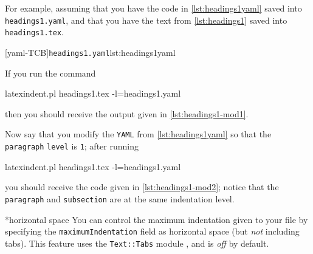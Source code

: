  \begin{example}
 For example, assuming that you have the code in \cref{lst:headings1yaml} saved into
 \texttt{headings1.yaml}, and that you have the text from \cref{lst:headings1} saved into
 \texttt{headings1.tex}.

 \begin{cmhtcbraster}
  [yaml-TCB]{\texttt{headings1.yaml}}{lst:headings1yaml}
 \end{cmhtcbraster}

 If you run the command 

 \begin{commandshell}
latexindent.pl headings1.tex -l=headings1.yaml
\end{commandshell}

 then you should receive the output given in \cref{lst:headings1-mod1}.

 \begin{minipage}{.45\textwidth}
 \end{minipage}%
 \hfill
 \begin{minipage}{.45\textwidth}
 \end{minipage}
 \end{example}

 Now say that you modify the \texttt{YAML} from \cref{lst:headings1yaml} so that the
 \texttt{paragraph} \texttt{level} is \texttt{1}; after running 

 \begin{commandshell}
latexindent.pl headings1.tex -l=headings1.yaml
\end{commandshell}

 you should receive the code given in \cref{lst:headings1-mod2}; notice that the
 \texttt{paragraph} and \texttt{subsection} are at the same indentation level.


*{horizontal space}
 You can control the maximum indentation given to your file by
  specifying the \texttt{maximumIndentation}
 field as horizontal space (but \emph{not} including tabs). This feature uses the
 \texttt{Text::Tabs} module \cite{texttabs}, and is \emph{off} by default.%

